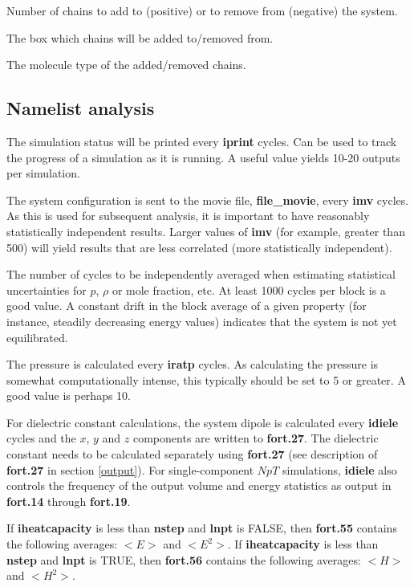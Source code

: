\documentclass[12pt,letterpaper]{article}
\begin{document}
 Number of chains to add to (positive)
or to remove from (negative) the system.

 The box which chains will be
added to/removed from.

 The molecule type of the
added/removed chains.

\subsection{Namelist \textbf{analysis}}
 The simulation status will be printed
every {\bf iprint} cycles. Can be used to track the progress
of a simulation as it is running. A useful value yields
10-20 outputs per simulation.

 The system configuration is sent to the
movie file, {\bf file\_movie}, every {\bf imv} cycles. As
this is used for subsequent analysis, it is important to
have reasonably statistically independent results. Larger
values of {\bf imv} (for example, greater than 500) will
yield results that are less correlated (more statistically
independent).

 The number of cycles to be
independently averaged when estimating statistical
uncertainties for $p$, $\rho$ or mole fraction, etc. At
least 1000 cycles per block is a good value. A constant
drift in the block average of a given property (for
instance, steadily decreasing energy values) indicates that
the system is not yet equilibrated.

 The pressure is calculated every {\bf
  iratp} cycles. As calculating the pressure is somewhat
computationally intense, this typically should be set to 5
or greater. A good value is perhaps 10.

 For dielectric constant calculations,
the system dipole is calculated every {\bf idiele} cycles
and the $x$, $y$ and $z$ components are written to {\bf
  fort.27}. The dielectric constant needs to be calculated
separately using {\bf fort.27} (see description of {\bf
  fort.27} in section \ref{output}). For single-component
$NpT$ simulations, {\bf idiele} also controls the frequency
of the output volume and energy statistics as output in {\bf
  fort.14} through {\bf fort.19}.

 If {\bf iheatcapacity} is less
than {\bf nstep} and {\bf lnpt} is FALSE, then {\bf fort.55}
contains the following averages: $<E>$ and $<E^2>$. If {\bf
  iheatcapacity} is less than {\bf nstep} and {\bf lnpt} is
TRUE, then {\bf fort.56} contains the following averages:
$<H>$ and $<H^2>$.
\end{document}

